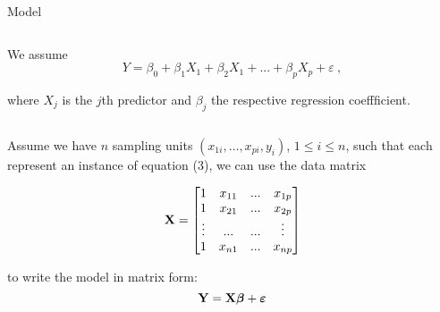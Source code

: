 \documentclass[10pt,ignorenonframetext,]{beamer}
\begin{document}
\begin{frame}

\begin{block}{Model}

\(~\)

We assume \begin{equation}
Y = \beta_0 + \beta_{1}  X_1 + \beta_2 X_1 + ... + \beta_p X_p + \varepsilon \ ,
\end{equation}

where \(X_j\) is the \(j\)th predictor and \(\beta_j\) the respective
regression coeffficient.

\(~\)

Assume we have \(n\) sampling units \((x_{1i},\ldots,x_{pi}, y_i)\),
\(1\leq i \leq n\), such that each represent an instance of equation
(3), we can use the data matrix

\[{\bf{X}} = \left[\begin{matrix} 1 & x_{11} & ... & x_{1p} \\
1 & x_{21} & ... & x_{2p} \\
\vdots  & ... & ... & \vdots \\
1 & x_{n1} & ... & x_{np} \\
\end{matrix}\right]\]

to write the model in matrix form:
\[{\bf Y}={\bf {X}} \boldsymbol{\beta}+{\boldsymbol{\varepsilon}} \]

\end{block}

\end{frame}
\end{document}
